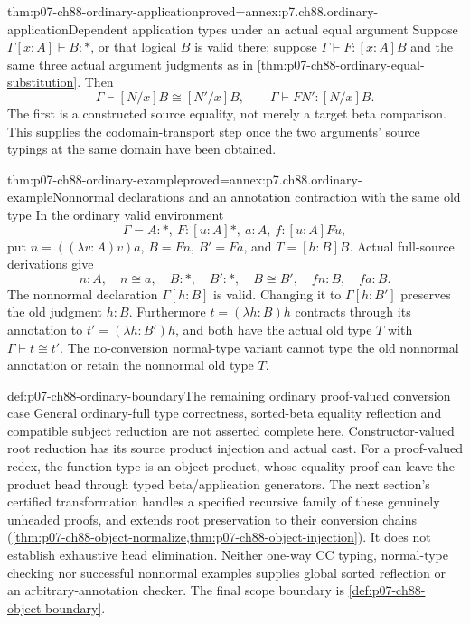 \begin{hbtheorem}{thm:p07-ch88-ordinary-application}{proved=annex:p7.ch88.ordinary-application}{Dependent application types under an actual equal argument}
Suppose \(\Gamma[x:A]\vdash B:\ast\), or that logical \(B\)
is valid there; suppose \(\Gamma\vdash F:[x:A]B\) and the same
three actual argument judgments as in
\cref{thm:p07-ch88-ordinary-equal-substitution}. Then
\[
 \Gamma\vdash[N/x]B\cong[N'/x]B,\qquad
 \Gamma\vdash FN':[N/x]B.
\]
The first is a constructed source equality, not merely a target beta
comparison. This supplies the codomain-transport step once the two
arguments' source typings at the same domain have been obtained.
\end{hbtheorem}

\begin{hbtheorem}{thm:p07-ch88-ordinary-example}{proved=annex:p7.ch88.ordinary-example}{Nonnormal declarations and an annotation contraction with the same old type}
In the ordinary valid environment
\[
 \Gamma=A:\ast,\ F:[u:A]\ast,\ a:A,\ f:[u:A]Fu,
\]
put \(n=((\lambda v:A)v)a\), \(B=Fn\), \(B'=Fa\), and
\(T=[h:B]B\). Actual full-source derivations give
\[
 n:A,\quad n\cong a,\quad B:\ast,\quad B':\ast,
 \quad B\cong B',\quad fn:B,\quad fa:B.
\]
The nonnormal declaration \(\Gamma[h:B]\) is valid. Changing it
to \(\Gamma[h:B']\) preserves the old judgment \(h:B\).
Furthermore \(t=(\lambda h:B)h\) contracts through its annotation
to \(t'=(\lambda h:B')h\), and both have the actual old type \(T\)
with \(\Gamma\vdash t\cong t'\).
The no-conversion normal-type variant cannot type the old nonnormal
annotation or retain the nonnormal old type \(T\).
\end{hbtheorem}

\begin{proofboundary}{def:p07-ch88-ordinary-boundary}{The remaining ordinary proof-valued conversion case}
General ordinary-full type correctness, sorted-beta equality reflection
and compatible subject reduction are not asserted complete here.
Constructor-valued root reduction has its source product injection and
actual cast. For a proof-valued redex, the function type is an object
product, whose equality proof can leave the product head through typed
beta/application generators. The next section's certified transformation
handles a specified recursive family of these genuinely unheaded proofs,
and extends root preservation to their conversion chains
(\cref{thm:p07-ch88-object-normalize,thm:p07-ch88-object-injection}).
It does not establish exhaustive head elimination. Neither one-way CC
typing, normal-type checking nor successful nonnormal examples supplies
global sorted reflection or an arbitrary-annotation checker. The final
scope boundary is \cref{def:p07-ch88-object-boundary}.
\end{proofboundary}
